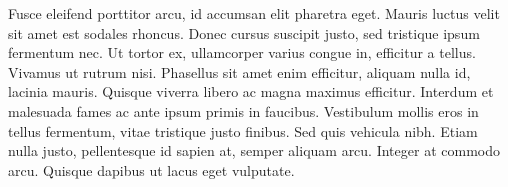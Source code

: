 \documentclass[
  UTF8, %
  12pt, %
]{essay}
\begin{document}
Fusce eleifend porttitor arcu, id accumsan elit pharetra eget. Mauris luctus velit sit amet est sodales rhoncus. Donec cursus suscipit justo, sed tristique ipsum fermentum nec. Ut tortor ex, ullamcorper varius congue in, efficitur a tellus. Vivamus ut rutrum nisi. Phasellus sit amet enim efficitur, aliquam nulla id, lacinia mauris. Quisque viverra libero ac magna maximus efficitur. Interdum et malesuada fames ac ante ipsum primis in faucibus. Vestibulum mollis eros in tellus fermentum, vitae tristique justo finibus. Sed quis vehicula nibh. Etiam nulla justo, pellentesque id sapien at, semper aliquam arcu. Integer at commodo arcu. Quisque dapibus ut lacus eget vulputate.


\printbibliography

\end{document}

